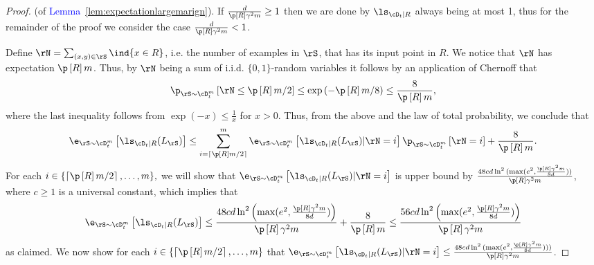\begin{proof}(of \textcolor{blue}{Lemma}~\ref{lem:expectationlargemarign}).
    If $ \frac{d}{\p\left[R\right]\gamma^{2}m} \geq1$ then we are done by $ \ls_{\cD_{t}|R} $ always being at most 1, thus for the remainder of the proof we consider the case $ \frac{d}{\p\left[R\right]\gamma^{2}m} <1$.
    
    Define $ \rN=\sum_{(x,y)\in \rS} \ind\{x\in R  \}   $, i.e. the number of examples in $ \rS $, that has its input point in $ R $. We notice that $ \rN $ has expectation $ \p\left[R\right]m $. Thus, by $ \rN $ being a sum of i.i.d. $ \{  0,1\}  $-random variables it follows by an application of Chernoff that 
    \begin{align*}
     \p_{\rS\sim \cD_{t}^{m}}\left[\rN\leq \p\left[R\right]m/2\right]\leq  \exp{\left(-\p\left[R\right]m/8 \right)}\leq \frac{8}{\p\left[R\right]m},  
    \end{align*} 
    where the last inequality follows from $ \exp(-x)\leq \frac{1}{x} $ for $ x>0 $.
    Thus, from the above and the law of total probability, we conclude that 
    \begin{align}\label{eq:condtionalexpectation-1}
     \e_{\rS\sim \cD_{t}^{m}}\left[\ls_{\cD_{t}|R}(L_{\rS})\right] 
      \leq \sum_{i=\left\lceil\p\left[R\right]m/2\right\rceil}^{m} \e_{\rS\sim \cD_{t}^{m}}\left[\ls_{\cD_{t}|R}(L_{\rS})|\rN=i \right]\p_{\rS\sim \cD_{t}^{m}}\left[\rN=i\right] +\frac{8}{\p\left[R\right]m}.
    \end{align}
    For each $ i\in \{\left\lceil\p\left[R\right]m/2\right\rceil,\ldots,m  \} ,$ we will show that $ \e_{\rS\sim \cD_{t}^{m}}\left[\ls_{\cD_{t}|R}(L_{\rS})|\rN=i \right]$ is upper bound by $\frac{48 cd\ln^{2}{( \max(e^{2},\frac{\p\left[R\right]\gamma^{2}m}{8d}))}}{\p\left[R\right]\gamma^{2}m} $, where $ c \geq 1$ is a universal constant, which implies that
    \begin{align*}
        \e_{\rS\sim \cD_{t}^{m}}\left[\ls_{\cD_{t}|R}(L_{\rS})\right] \leq  \frac{48 cd\ln^{2}{\left( \max(e^{2},\frac{\p\left[R\right]\gamma^{2}m}{8d})\right)}}{\p\left[R\right]\gamma^{2}m}+\frac{8}{\p\left[R\right]m}\leq\frac{56 cd\ln^{2}{\left( \max(e^{2},\frac{\p\left[R\right]\gamma^{2}m}{8d})\right)}}{\p\left[R\right]\gamma^{2}m}
    \end{align*}
    as claimed. We now show for each $ i\in \{\left\lceil\p\left[R\right]m/2\right\rceil,\ldots,m  \}  $ that $ \e_{\rS\sim \cD_{t}^{m}}\left[\ls_{\cD_{t}|R}(L_{\rS})|\rN=i \right]\leq \frac{48 cd\ln^{2}{( \max(e^{2},\frac{\p\left[R\right]\gamma^{2}m}{8d})))}}{\p\left[R\right]\gamma^{2}m}$.


\end{proof}
